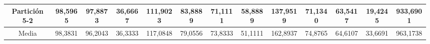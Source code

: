 \documentclass[12pt]{article}
\begin{document}
\begin{table}[H]
{\begin{tabular}{|c|cccc|cccc|cccc|}
Partición 5-2 & \multicolumn{1}{c|}{98,5965}                                                  & \multicolumn{1}{c|}{97,8873}                                                 & \multicolumn{1}{c|}{36,6667} & 111,9023 & \multicolumn{1}{c|}{83,8889}                                                  & \multicolumn{1}{c|}{71,1111}                                                 & \multicolumn{1}{c|}{58,8889} & 137,9519 & \multicolumn{1}{c|}{71,1340}                                                  & \multicolumn{1}{c|}{63,5417}                                                 & \multicolumn{1}{c|}{19,4245} & 933,6901  \\ \hline
Media         & \multicolumn{1}{c|}{98,3831}                                                  & \multicolumn{1}{c|}{96,2043}                                                 & \multicolumn{1}{c|}{36,3333} & 117,0848 & \multicolumn{1}{c|}{79,0556}                                                  & \multicolumn{1}{c|}{73,8333}                                                 & \multicolumn{1}{c|}{51,1111} & 162,8937 & \multicolumn{1}{c|}{74,8765}                                                  & \multicolumn{1}{c|}{64,6107}                                                 & \multicolumn{1}{c|}{33,6691} & 963,1738  \\ \hline
\end{tabular}}
\end{table}
\end{document}

